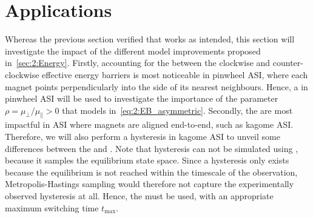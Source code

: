 \section{Applications}
Whereas the previous section verified that \hotspice works as intended, this section will investigate the impact of the different model improvements proposed in~\cref{sec:2:Energy}.
Firstly, accounting for the  between the clockwise and counter-clockwise effective energy barriers is most noticeable in pinwheel ASI, where each magnet points perpendicularly into the side of its nearest neighbours.
Hence, a  in pinwheel ASI will be used to investigate the importance of the parameter $\rho = \mu_\perp/\mu_\parallel > 0$ that models  in~\cref{eq:2:EB_asymmetric}.
Secondly, the  are most impactful in ASI where magnets are aligned end-to-end, such as kagome ASI.
Therefore, we will also perform a hysteresis in kagome ASI to unveil some differences between the  and .
Note that hysteresis can not be simulated using , because it samples the equilibrium state space. %
Since a hysteresis only exists because the equilibrium is not reached within the timescale of the observation, Metropolis-Hastings sampling would therefore not capture the experimentally observed hysteresis at all.
Hence, the  must be used, with an appropriate maximum switching time $t_\mathrm{max}$. 

